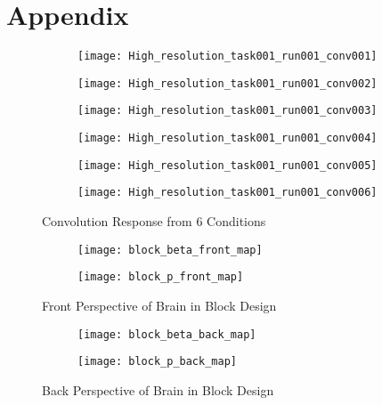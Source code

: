 \newpage
\appendix
\section*{Appendix}
\begin{figure}[ht]
\begin{subfigure}{.33\textwidth}
  \centering
  \texttt{[image: High\_resolution\_task001\_run001\_conv001]}
\end{subfigure}%
\begin{subfigure}{.33\textwidth}
  \centering
  \texttt{[image: High\_resolution\_task001\_run001\_conv002]}
\end{subfigure}%
\begin{subfigure}{.33\textwidth}
  \centering
  \texttt{[image: High\_resolution\_task001\_run001\_conv003]}
\end{subfigure}
\begin{subfigure}{.33\textwidth}
  \centering
  \texttt{[image: High\_resolution\_task001\_run001\_conv004]}
\end{subfigure}%
\begin{subfigure}{.33\textwidth}
  \centering
  \texttt{[image: High\_resolution\_task001\_run001\_conv005]}
\end{subfigure}%
\begin{subfigure}{.33\textwidth}
  \centering
  \texttt{[image: High\_resolution\_task001\_run001\_conv006]}
\end{subfigure}
\caption{Convolution Response from 6 Conditions\label{fig:ConvRes}}
\end{figure}

\newpage
\begin{figure}[ht]
\centering
\begin{subfigure}{.45\textwidth}
  \texttt{[image: block\_beta\_front\_map]}
\end{subfigure}%
\begin{subfigure}{.5\textwidth}
  \texttt{[image: block\_p\_front\_map]}
  \centering
\end{subfigure}
\caption{Front Perspective of Brain in Block Design\label{fig:fpBrain}}
\end{figure}

\begin{figure}[ht]
\centering
\begin{subfigure}{.45\textwidth}
  \texttt{[image: block\_beta\_back\_map]}
\end{subfigure}%
\begin{subfigure}{.5\textwidth}
  \texttt{[image: block\_p\_back\_map]}
  \centering
\end{subfigure}
\caption{Back Perspective of Brain in Block Design\label{fig:bpBrain}}
\end{figure}




